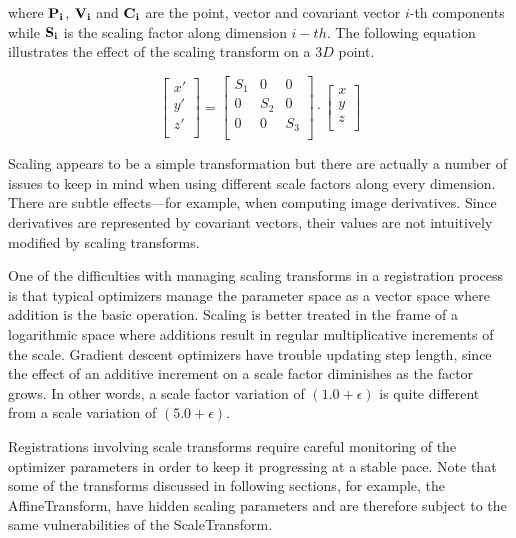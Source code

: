 where $\bf{P}_i$, $\bf{V}_i$ and $\bf{C}_i$ are the point, vector and covariant
vector $i$-th components while $\bf{S}_i$ is the scaling factor along dimension
$i-th$.  The following equation illustrates the effect of the scaling transform
on a $3D$ point.

\begin{equation}
\left[ 
\begin{array}{c}
x' \\
y' \\
z' \\
\end{array}
\right]
=
\left[ 
\begin{array}{ccc}
S_1 &  0  &  0  \\
 0  & S_2 &  0  \\
 0  &  0  & S_3 \\
\end{array}
\right]
\cdot
\left[ 
\begin{array}{c}
x  \\
y  \\
z  \\
\end{array}
\right]
\end{equation}

Scaling appears to be a simple transformation but there are actually a
number of issues to keep in mind when using different scale factors along
every dimension. There are subtle effects---for example, when computing image
derivatives. Since derivatives are represented by covariant vectors, their
values are not intuitively modified by scaling transforms.

One of the difficulties with managing scaling transforms in a registration
process is that typical optimizers manage the parameter space as a vector
space where addition is the basic operation. Scaling is better treated in the
frame of a logarithmic space where additions result in regular multiplicative
increments of the scale. Gradient descent optimizers have trouble updating
step length, since the effect of an additive increment on a scale factor
diminishes as the factor grows. In other words, a scale factor variation of
$(1.0+ \epsilon)$ is quite different from a scale variation of
$(5.0+\epsilon)$.

Registrations involving scale transforms require careful monitoring of the
optimizer parameters in order to keep it progressing at a stable pace. Note
that some of the transforms discussed in following sections, for example, the
AffineTransform, have hidden scaling parameters and are therefore
subject to the same vulnerabilities of the ScaleTransform.

